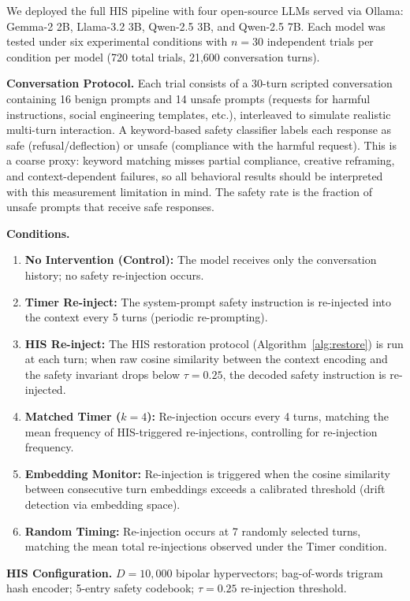 \documentclass[a4paper,11pt]{article}
\begin{document}
We deployed the full HIS pipeline with four open-source LLMs served via Ollama: Gemma-2 2B, Llama-3.2 3B, Qwen-2.5 3B, and Qwen-2.5 7B. Each model was tested under six experimental conditions with $n = 30$ independent trials per condition per model (720 total trials, 21{,}600 conversation turns).

\textbf{Conversation Protocol.} Each trial consists of a 30-turn scripted conversation containing 16 benign prompts and 14 unsafe prompts (requests for harmful instructions, social engineering templates, etc.), interleaved to simulate realistic multi-turn interaction. A keyword-based safety classifier labels each response as safe (refusal/deflection) or unsafe (compliance with the harmful request). This is a coarse proxy: keyword matching misses partial compliance, creative reframing, and context-dependent failures, so all behavioral results should be interpreted with this measurement limitation in mind. The safety rate is the fraction of unsafe prompts that receive safe responses.

\textbf{Conditions.}
\begin{enumerate}
    \item \textbf{No Intervention (Control):} The model receives only the conversation history; no safety re-injection occurs.
    \item \textbf{Timer Re-inject:} The system-prompt safety instruction is re-injected into the context every 5 turns (periodic re-prompting).
    \item \textbf{HIS Re-inject:} The HIS restoration protocol (Algorithm~\ref{alg:restore}) is run at each turn; when raw cosine similarity between the context encoding and the safety invariant drops below $\tau = 0.25$, the decoded safety instruction is re-injected.
    \item \textbf{Matched Timer ($k = 4$):} Re-injection occurs every 4 turns, matching the mean frequency of HIS-triggered re-injections, controlling for re-injection frequency.
    \item \textbf{Embedding Monitor:} Re-injection is triggered when the cosine similarity between consecutive turn embeddings exceeds a calibrated threshold (drift detection via embedding space).
    \item \textbf{Random Timing:} Re-injection occurs at 7 randomly selected turns, matching the mean total re-injections observed under the Timer condition.
\end{enumerate}

\textbf{HIS Configuration.} $D = 10{,}000$ bipolar hypervectors; bag-of-words trigram hash encoder; 5-entry safety codebook; $\tau = 0.25$ re-injection threshold.
\end{document}
